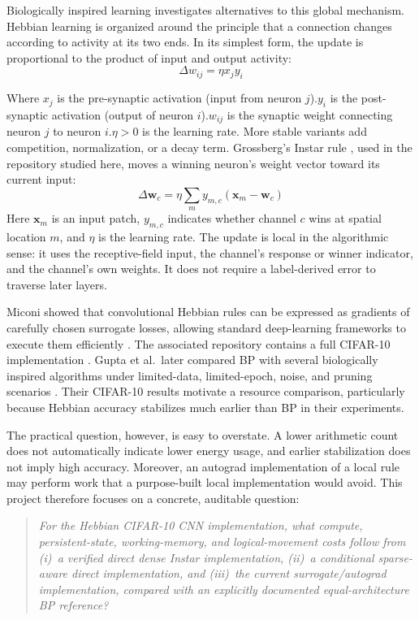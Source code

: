 \documentclass{article}
\begin{document}
    Biologically inspired learning investigates alternatives to this global mechanism. Hebbian learning \cite{hebb1949organization} is organized around the principle that a connection changes according to activity at its two ends. In its simplest form, the update is proportional to the product of input and output activity:
    \begin{equation}
        \Delta w_{ij} = \eta x_j y_i
    \end{equation}

    Where $x_j$ is the pre-synaptic activation (input from neuron $j$).$y_i$ is the post-synaptic activation (output of neuron $i$).$w_{ij}$ is the synaptic weight connecting neuron $j$ to neuron $i$.$\eta > 0$ is the learning rate.
    More stable variants add competition, normalization, or a decay term. Grossberg's Instar rule \cite{grossberg1976adaptive}, used in the repository \cite{miconi2021hebbian} studied here, moves a winning neuron's weight vector toward its current input:
    \begin{equation}
    \Delta \mathbf{w}_c = \eta \sum_m y_{m,c} (\mathbf{x}_m - \mathbf{w}_c)
    \label{eq:instar_intro}
    \end{equation}
    Here $\mathbf{x}_m$ is an input patch, $y_{m,c}$ indicates whether channel $c$ wins at spatial location $m$, and $\eta$ is the learning rate. The update is local in the algorithmic sense: it uses the receptive-field input, the channel's response or winner indicator, and the channel's own weights. It does not require a label-derived error to traverse later layers.
    
    Miconi showed that convolutional Hebbian rules can be expressed as gradients of carefully chosen surrogate losses, allowing standard deep-learning frameworks to execute them efficiently \citep{miconi2021hebbian}. The associated repository contains a full CIFAR-10 implementation \citep{miconi2021repo}. Gupta et al.\ later compared BP with several biologically inspired algorithms under limited-data, limited-epoch, noise, and pruning scenarios \citep{gupta2023bio}. Their CIFAR-10 results motivate a resource comparison, particularly because Hebbian accuracy stabilizes much earlier than BP in their experiments.
    
    The practical question, however, is easy to overstate. A lower arithmetic count does not automatically indicate lower energy usage, and earlier stabilization does not imply high accuracy. Moreover, an autograd implementation of a local rule may perform work that a purpose-built local implementation would avoid. This project therefore focuses on a concrete, auditable question:
    \begin{quote}
    \itshape
    For the Hebbian CIFAR-10 CNN implementation\cite{miconi2021repo}, what compute, persistent-state, working-memory, and logical-movement costs follow from (i)~a verified direct dense Instar implementation, (ii)~a conditional sparse-aware direct implementation, and (iii)~the current surrogate/autograd implementation, compared with an explicitly documented equal-architecture BP reference?
    \end{quote}
    
\end{document}

